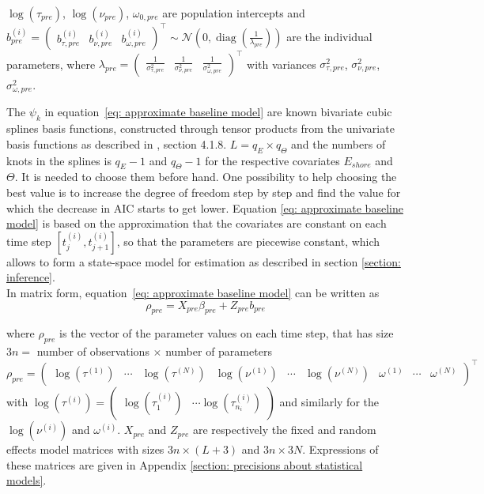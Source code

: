 \documentclass[11pt]{article}
\DeclareMathOperator{\diag}{diag}
\newcommand {\1}{\mathbb{1}}
\begin{document}
$\log(\tau_{pre})$, $\log(\nu_{pre})$, $\omega_{0,pre}$ are population intercepts and $b^{(i)}_{pre}=\begin{pmatrix} b_{\tau,pre}^{(i)} & b_{\nu,pre}^{(i)} & b_{\omega,pre}^{(i)} \end{pmatrix}^\top \sim \mathcal{N}\left( 0, \diag\left(\frac{1}{\lambda_{pre}}\right)\right)$
are the individual parameters, where $\lambda_{pre}=\begin{pmatrix} \frac{1}{\sigma_{\tau,pre}^2} & \frac{1}{\sigma_{\nu,pre}^2} & \frac{1}{\sigma_{\omega,pre}^2} \end{pmatrix}^\top$ with variances $\sigma_{\tau,pre}^2$, $\sigma_{\nu,pre}^2$, $\sigma_{\omega,pre}^2$.

The $\psi_k$ in equation~\ref{eq: approximate baseline model} are  known bivariate cubic splines basis functions, constructed through tensor products from the univariate basis functions as described in \cite{wood_generalized_2017}, section 4.1.8.
$L=q_E \times q_{\Theta}$ and the numbers of knots in the splines is $q_E-1$ and $q_{\Theta}-1$ for the respective covariates $E_{shore}$ and $\Theta$. It is needed to choose them before hand. One possibility to help choosing the best value is to increase the degree of freedom step by step  and find the value for which the decrease in AIC starts to get lower. Equation \ref{eq: approximate baseline model} is based on the approximation that the covariates are constant on each time step $[t_j^{(i)},t_{j+1}^{(i)}]$, so that the parameters are piecewise constant, which allows to form a state-space model for estimation as described in section \ref{section: inference}.\\
In matrix form, equation~\ref{eq: approximate baseline model} can be written as
\begin{equation}
	\rho_{pre}= X_{pre} \beta_{pre}
	+Z_{pre}b_{pre}
\end{equation}

where $\rho_{pre}$ is the vector of the parameter values on each time step, that has size $3n=$ number of observations $\times$ number of parameters  \[\rho_{pre}=\begin{pmatrix}
\log(\tau^{(1)}) & \cdots & \log(\tau^{(N)}) & \log(\nu^{(1)}) &
\cdots & \log(\nu^{(N)}) & \omega^{(1)}  &\cdots & \omega^{(N)}
\end{pmatrix}^\top\]
with $	\log(\tau^{(i)})=\begin{pmatrix} \log(\tau^{(i)}_1) & \cdots \log(\tau^{(i)}_{n_i})\end{pmatrix}$ and similarly for the $\log(\nu^{(i)})$ and $\omega^{(i)}$.
$X_{pre}$ and $Z_{pre}$ are respectively the fixed and random effects model matrices with sizes $3n \times (L+3)$ and $3n \times 3N$. Expressions of these matrices are given in Appendix \ref{section: precisions about statistical models}.
\end{document}
